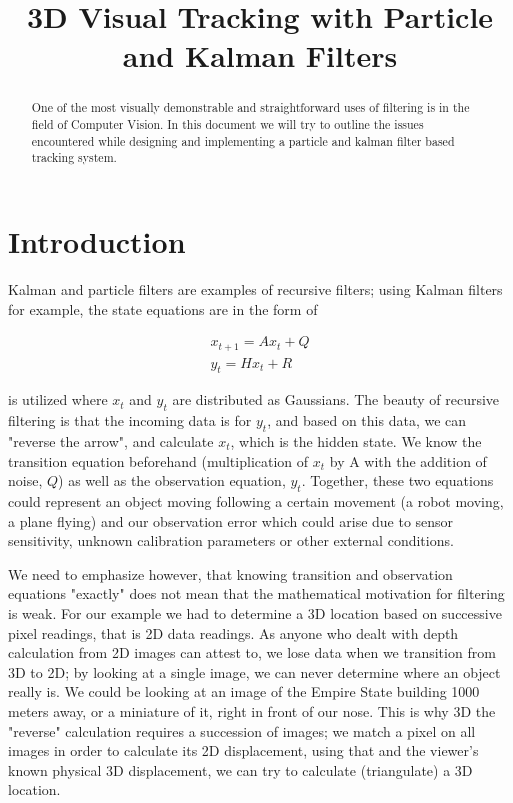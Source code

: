 \documentclass[11pt]{article}
\begin{document}
\title{3D Visual Tracking with Particle and Kalman Filters}


\begin{abstract}
One of the most visually demonstrable and straightforward uses of filtering is
in the field of Computer Vision. In this document we will try to outline the
issues encountered while designing and implementing a particle and kalman filter
based tracking system.
\end{abstract}

\section{Introduction}

Kalman and particle filters are examples of recursive filters; using Kalman
filters for example,  the state equations are in the form of 

\begin{eqnarray*}
x_{t+1} = A x_t + Q\\
y_t = Hx_t + R
\end{eqnarray*}

is utilized where $x_t$ and $y_t$ are distributed as Gaussians. The beauty of
recursive filtering is that the incoming data is for $y_t$, and based on this
data, we can "reverse the arrow", and calculate $x_t$, which is the hidden
state. We know the transition equation beforehand (multiplication of $x_t$ by A
with the addition of noise, $Q$) as well as the observation equation,
$y_t$. Together, these two equations could represent an object moving following
a certain movement (a robot moving, a plane flying) and our observation error
which could arise due to sensor sensitivity, unknown calibration parameters or
other external conditions.

We need to emphasize however, that knowing transition and observation equations
"exactly" does not mean that the mathematical motivation for filtering is
weak. For our example we had to determine a 3D location based on successive
pixel readings, that is 2D data readings. As anyone who dealt with depth
calculation from 2D images can attest to, we lose data when we transition from
3D to 2D; by looking at a single image, we can never determine where an object
really is. We could be looking at an image of the Empire State building 1000
meters away, or a miniature of it, right in front of our nose. This is why 3D
the "reverse" calculation requires a succession of images; we match a pixel on
all images in order to calculate its 2D displacement, using that and the
viewer's known physical 3D displacement, we can try to calculate (triangulate) a
3D location.
\end{document}
